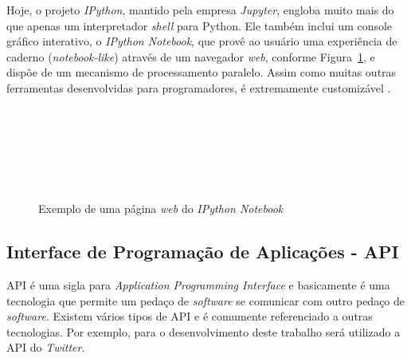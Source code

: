 Hoje, o projeto \textit{IPython}, mantido pela empresa \textit{Jupyter}, engloba muito mais do que apenas um interpretador \textit{shell} para Python. Ele também inclui um console gráfico interativo, o \textit{IPython Notebook}, que provê ao usuário uma experiência de caderno (\textit{notebook-like}) através de um navegador \textit{web}, conforme Figura~\ref{ipython-fig}, e dispõe de um mecanismo de processamento paralelo. Assim como muitas outras ferramentas desenvolvidas para programadores, é extremamente customizável \cite{mining-social-web}. \\ \\ \\ \\ \\ \\ \\

\begin{figure}[h!]
  \centering
  \caption{Exemplo de uma página \textit{web} do \textit{IPython Notebook}}
  \vspace{-0.3cm}
  \label{ipython-fig}
\end{figure}

\subsection{Interface de Programação de Aplicações - API}\label{subsec: api}
API é uma sigla para \textit{Application Programming Interface} e basicamente é uma tecnologia que permite um pedaço de \textit{software} se comunicar com outro pedaço de \textit{software}. Existem vários tipos de API e é comumente referenciado a outras tecnologias. Por exemplo, para o desenvolvimento deste trabalho será utilizado a API do \textit{Twitter}. 

